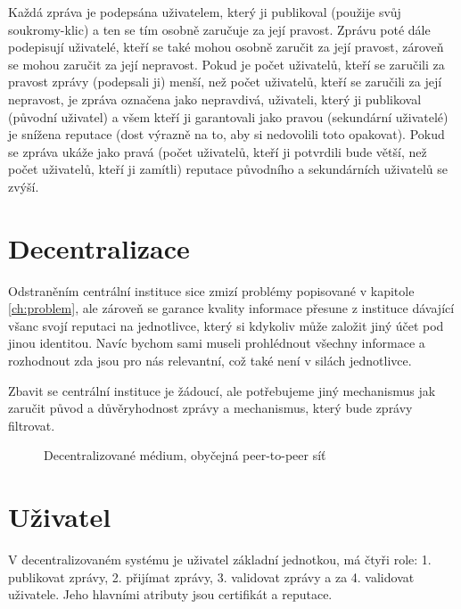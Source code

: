\documentclass[12pt,a4paper]{report}
\begin{document}
Každá zpráva je podepsána uživatelem, který ji publikoval (použije svůj \gls{soukromy-klic}) a ten se tím osobně zaručuje za její pravost. Zprávu poté dále podepisují uživatelé, kteří se také mohou osobně zaručit za její pravost, zároveň se mohou zaručit za její nepravost. Pokud je počet uživatelů, kteří se zaručili za pravost zprávy (podepsali ji) menší, než počet uživatelů, kteří se zaručili za její nepravost, je zpráva označena jako nepravdivá, uživateli, který ji publikoval (původní uživatel) a všem kteří ji garantovali jako pravou (sekundární uživatelé) je snížena reputace (dost výrazně na to, aby si nedovolili toto opakovat). Pokud se zpráva ukáže jako pravá (počet uživatelů, kteří ji potvrdili bude větší, než počet uživatelů, kteří ji zamítli) reputace původního a sekundárních uživatelů se zvýší.

\section{Decentralizace}
\label{sec:decentralizace}
Odstraněním centrální instituce sice zmizí problémy popisované v kapitole \ref{ch:problem}, ale zároveň se garance kvality informace přesune z instituce dávající všanc svojí reputaci na jednotlivce, který si kdykoliv může založit jiný účet pod jinou identitou. Navíc bychom sami museli prohlédnout všechny informace a rozhodnout zda jsou pro nás relevantní, což také není v silách jednotlivce. \citep{netanel01}

Zbavit se centrální instituce je žádoucí, ale potřebujeme jiný mechanismus jak zaručit původ a důvěryhodnost zprávy a mechanismus, který bude zprávy filtrovat.

\begin{figure}
\centering
{}
\caption{Decentralizované médium, obyčejná \gls{peer-to-peer} síť}
\end{figure}

\section{Uživatel}
\label{sec:uzivatel}
V decentralizovaném systému je uživatel základní jednotkou, má čtyři role: 1. publikovat zprávy, 2. přijímat zprávy, 3. validovat zprávy a za 4. validovat uživatele. Jeho hlavními atributy jsou certifikát a reputace.
\end{document}
